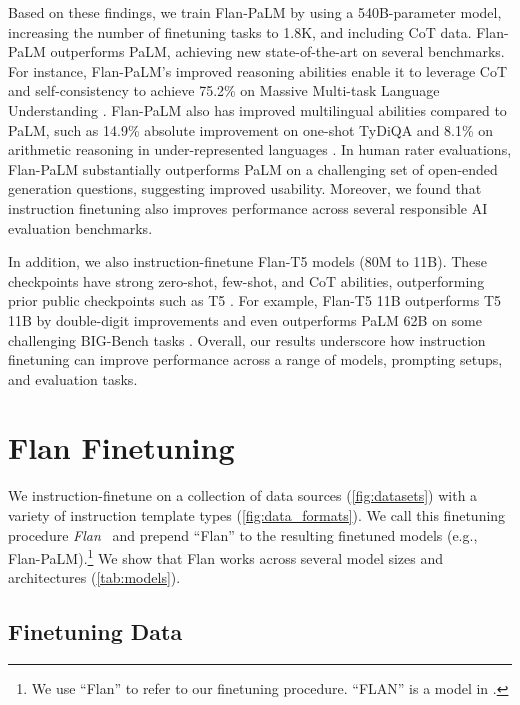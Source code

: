 Based on these findings, we train Flan-PaLM by using a 540B-parameter model, increasing the number of finetuning tasks to 1.8K, and including CoT data. Flan-PaLM outperforms PaLM, achieving new state-of-the-art on several benchmarks. For instance, Flan-PaLM's improved reasoning abilities enable it to leverage CoT and self-consistency \citep{wang2022benchmarking} to achieve 75.2\% on Massive Multi-task Language Understanding \citep[MMLU;][]{hendrycks2020measuring}.
Flan-PaLM also has improved multilingual abilities compared to PaLM, such as 14.9\% absolute improvement on one-shot TyDiQA \citep{clark-etal-2020-tydi} and 8.1\% on arithmetic reasoning in under-represented languages \citep{shi2022language}. In human rater evaluations, Flan-PaLM substantially outperforms PaLM on a challenging set of open-ended generation questions, suggesting improved usability. Moreover, we found that instruction finetuning also improves performance across several responsible AI evaluation benchmarks. 

In addition, we also instruction-finetune Flan-T5 models (80M to 11B). These checkpoints have strong zero-shot, few-shot, and CoT abilities, outperforming prior public checkpoints such as T5 \citep{raffel2020exploring}. For example, Flan-T5 11B outperforms T5 11B by double-digit improvements and even outperforms PaLM 62B on some challenging BIG-Bench tasks \citep{bigbench}. Overall, our results underscore how instruction finetuning can improve performance across a range of models, prompting setups, and evaluation tasks.

\section{Flan Finetuning}

We instruction-finetune on a collection of data sources (\ref{fig:datasets}) with a variety of instruction template types (\ref{fig:data_formats}).
We call this finetuning procedure \textit{Flan}~\citep[Finetuning language models;][]{wei2021finetuned} and prepend ``Flan'' to the resulting finetuned models (e.g., Flan-PaLM).\footnote{We use ``Flan'' to refer to our finetuning procedure. ``FLAN'' is a model in \citet{wei2021finetuned}.}
We show that Flan works across several model sizes and architectures (\ref{tab:models}).

\subsection{Finetuning Data}
\label{sec:finetuning-data}

